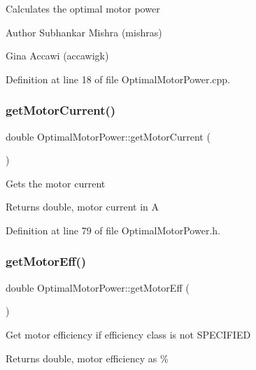 Calculates the optimal motor power

\begin{DoxyAuthor}{Author}
Subhankar Mishra (mishras) 

Gina Accawi (accawigk) 
\end{DoxyAuthor}


Definition at line 18 of file Optimal\+Motor\+Power.\+cpp.

\mbox{\label{class_optimal_motor_power_a2c058c4320a840018a420e10272cc4dd}} 
\subsubsection{\texorpdfstring{get\+Motor\+Current()}{getMotorCurrent()}}
{\footnotesize\ttfamily double Optimal\+Motor\+Power\+::get\+Motor\+Current (\begin{DoxyParamCaption}{ }\end{DoxyParamCaption})\hspace{0.3cm}{\ttfamily [inline]}}

Gets the motor current \begin{DoxyReturn}{Returns}
double, motor current in A 
\end{DoxyReturn}


Definition at line 79 of file Optimal\+Motor\+Power.\+h.

\mbox{\label{class_optimal_motor_power_a341fe7520227f27f9cce23f3dc4cb0cb}} 
\subsubsection{\texorpdfstring{get\+Motor\+Eff()}{getMotorEff()}}
{\footnotesize\ttfamily double Optimal\+Motor\+Power\+::get\+Motor\+Eff (\begin{DoxyParamCaption}{ }\end{DoxyParamCaption})\hspace{0.3cm}{\ttfamily [inline]}}

Get motor efficiency if efficiency class is not S\+P\+E\+C\+I\+F\+I\+ED \begin{DoxyReturn}{Returns}
double, motor efficiency as \% 
\end{DoxyReturn}


